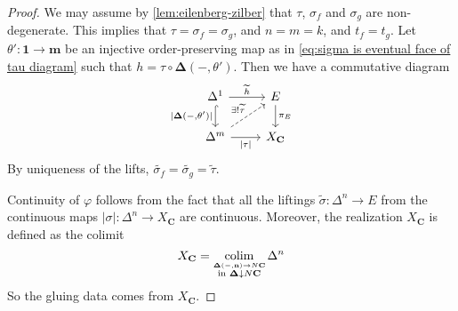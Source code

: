 \begin{proof}
We may assume by \cref{lem:eilenberg-zilber} that $\tau$, $\sigma_f$ and $\sigma_g$ are non-degenerate.
This implies that $\tau = \sigma_f = \sigma_g$, and $n=m=k$, and $t_f = t_g$. Let $\theta' : \mathbf{1} \to \mathbf{m}$ be an injective order-preserving map as in \cref{eq:sigma is eventual face of tau diagram} such that $h = \tau \circ \mathbf{\Delta}(-,\theta')$. Then we have a commutative diagram
\[ \begin{tikzcd}
\Delta^1 \arrow{r}{\widetilde{h}} \arrow[hook, swap]{d}{|\mathbf{\Delta}(-,\theta')|} & E \arrow{d}{\pi_E} \\
\Delta^m \arrow[swap]{r}{|\tau|} \arrow[dashed]{ur}{\exists ! \widetilde{\tau}} & X_{\mathbf{C}} \end{tikzcd} \]
By uniqueness of the lifts, $\widetilde{\sigma_f} = \widetilde{\sigma_g} = \widetilde{\tau}$.

Continuity of $\varphi$ follows from the fact that all the liftings $\widetilde{\sigma} : \Delta^n \to E$ from the continuous maps $|\sigma| : \Delta^n \to X_{\mathbf{C}}$ are continuous. Moreover, the realization $X_{\mathbf{C}}$ is defined as the colimit
\[ X_{\mathbf{C}} = \operatorname*{colim}_{\stackrel{\mathbf{\Delta}(-,\mathbf{n}) \to N\mathbf{C}}{\text{in } \mathbf{\Delta} \downarrow N\mathbf{C}}}\Delta^n \]
So the gluing data comes from $X_{\mathbf{C}}$.

\end{proof}


